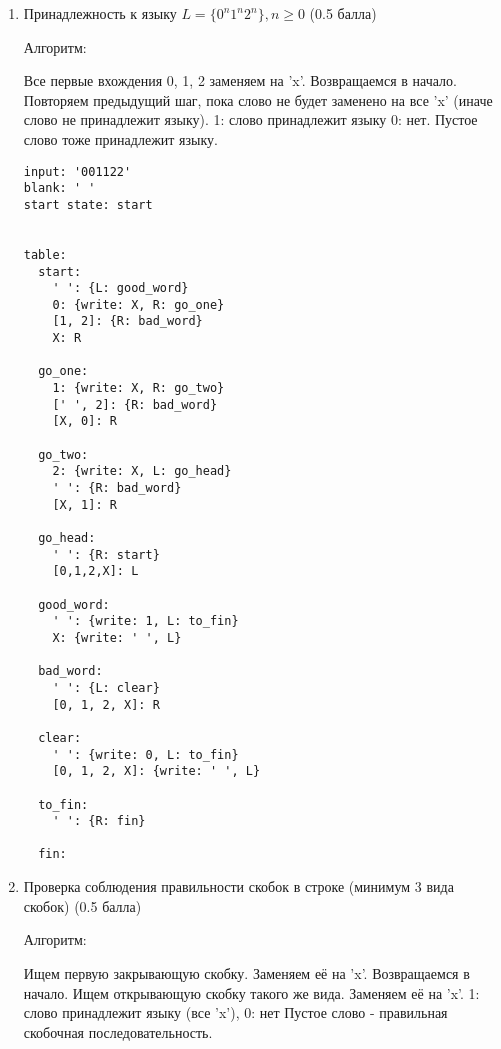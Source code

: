 \documentclass{article}
\begin{document}
\begin{enumerate}

    
    \item Принадлежность к языку $L = \{ 0^n1^n2^n \}, n \ge 0$ (0.5 балла)
    
        Алгоритм:
        \begin{enumerate}
            Все первые вхождения 0, 1, 2 заменяем на 'x'. Возвращаемся в начало.
            Повторяем предыдущий шаг, пока слово не будет заменено на все 'x' (иначе слово не принадлежит языку).
             1: слово принадлежит языку 0: нет.
             Пустое слово тоже принадлежит языку. 
        \end{enumerate}
        
        \begin{verbatim}
input: '001122'
blank: ' '
start state: start


table:
  start:
    ' ': {L: good_word}    
    0: {write: X, R: go_one} 
    [1, 2]: {R: bad_word}
    X: R    
  
  go_one:
    1: {write: X, R: go_two}
    [' ', 2]: {R: bad_word}
    [X, 0]: R
  
  go_two:
    2: {write: X, L: go_head}
    ' ': {R: bad_word}
    [X, 1]: R
  
  go_head:
    ' ': {R: start}
    [0,1,2,X]: L
  
  good_word:
    ' ': {write: 1, L: to_fin}
    X: {write: ' ', L}
  
  bad_word:
    ' ': {L: clear}
    [0, 1, 2, X]: R
  
  clear:
    ' ': {write: 0, L: to_fin}
    [0, 1, 2, X]: {write: ' ', L} 

  to_fin:
    ' ': {R: fin}
  
  fin:
        \end{verbatim}

        

   
    \item Проверка соблюдения правильности скобок в строке (минимум 3 вида скобок) (0.5 балла)
    
        Алгоритм:
        \begin{enumerate}
            
            Ищем первую закрывающую скобку. Заменяем её на 'x'. Возвращаемся в начало.
            Ищем открывающую скобку такого же вида. Заменяем её на 'x'. 
            1: слово принадлежит языку (все 'x'), 0: нет
            Пустое слово - правильная скобочная последовательность.
        \end{enumerate}
        

\end{enumerate}
\end{document}
